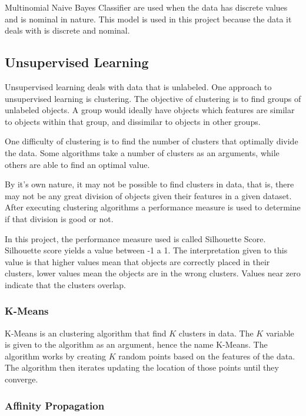 Multinomial Naive Bayes Classifier are used when the data has discrete values
and is nominal in nature. This model is used in this project because the data
it deals with is discrete and nominal.~\cite{book_ml,book_dm_practical}

\subsection{Unsupervised Learning}

Unsupervised learning deals with data that is unlabeled. One approach to
unsupervised learning is clustering. The objective of clustering is to find
groups of unlabeled objects. A group would ideally have objects which features
are similar to objects within that group, and dissimilar to objects in other
groups.

One difficulty of clustering is to find the number of clusters that optimally
divide the data. Some algorithms take a number of clusters as an arguments,
while others are able to find an optimal value.

By it's own nature, it may not be possible to find clusters in data, that is,
there may not be any great division of objects given their features in a given
dataset. After executing clustering algorithms a performance measure is used to
determine if that division is good or not.

In this project, the performance measure used is called Silhouette Score.
Silhouette score yields a value between -1 a 1. The interpretation given to
this value is that higher values mean that objects are correctly placed in
their clusters, lower values mean the objects are in the wrong clusters. Values
near zero indicate that the clusters overlap.~\cite{book_ml,book_dm_practical}

\subsubsection{K-Means}

K-Means is an clustering algorithm that find $ K $ clusters in data. The $ K $
variable is given to the algorithm as an argument, hence the name K-Means. The
algorithm works by creating $ K $ random points based on the features of the
data. The algorithm then iterates updating the location of those points until
they converge.~\cite{book_ml,book_dm_practical}

\subsubsection{Affinity Propagation}

